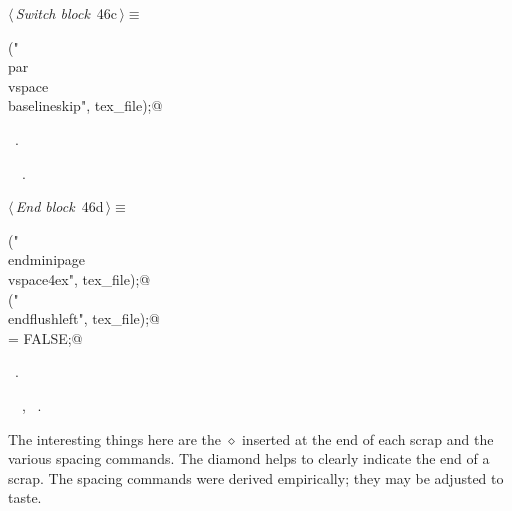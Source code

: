 \documentclass[a4paper]{report}
\begin{document}
\begin{flushleft} \small
\begin{minipage}{\linewidth}\label{scrap86}\raggedright\small
{} $\langle\,${\it Switch block}\nobreak\ {\footnotesize {46c}}$\,\rangle\equiv$
\vspace{-1ex}
\begin{list}{}{} \item
\mbox{}\verb@fputs("\\par\\vspace{\\baselineskip}\n",  tex_file);@{\NWsep}
\end{list}
\vspace{-1.5ex}
\footnotesize
\begin{list}{}{\setlength{\itemsep}{-\parsep}\setlength{\itemindent}{-\leftmargin}}
\item \NWtxtMacroRefIn\ .
\item \NWtxtIdentsUsed\nobreak\  \verb@fputs@\nobreak\ .
\item{}
\end{list}
\end{minipage}\vspace{4ex}
\end{flushleft}
\begin{flushleft} \small
\begin{minipage}{\linewidth}\label{scrap87}\raggedright\small
{} $\langle\,${\it End block}\nobreak\ {\footnotesize {46d}}$\,\rangle\equiv$
\vspace{-1ex}
\begin{list}{}{} \item
\mbox{}\verb@fputs("\\end{minipage}\\vspace{4ex}\n",  tex_file);@\\
\mbox{}\verb@fputs("\\end{flushleft}\n", tex_file);@\\
\mbox{}\verb@inBlock = FALSE;@{\NWsep}
\end{list}
\vspace{-1.5ex}
\footnotesize
\begin{list}{}{\setlength{\itemsep}{-\parsep}\setlength{\itemindent}{-\leftmargin}}
\item \NWtxtMacroRefIn\ .
\item \NWtxtIdentsUsed\nobreak\  \verb@FALSE@\nobreak\ , \verb@fputs@\nobreak\ .
\item{}
\end{list}
\end{minipage}\vspace{4ex}
\end{flushleft}
The interesting things here are the $\diamond$ inserted at the end of
each scrap and the various spacing commands. The diamond helps to
clearly indicate the end of a scrap. The spacing commands were derived
empirically; they may be adjusted to taste.
\end{document}
